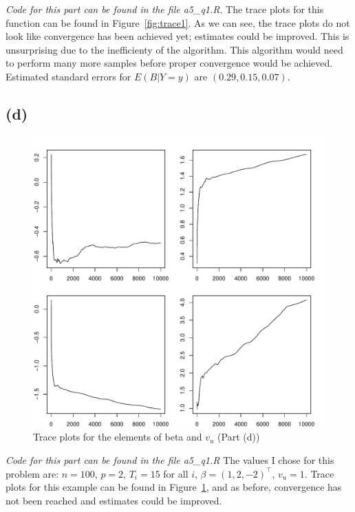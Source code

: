 \documentclass{article}\usepackage[]{graphicx}\usepackage[]{color}
\makeatletter
\def\maxwidth{ %
  \ifdim\Gin@nat@width>\linewidth
    \linewidth
  \else
    \Gin@nat@width
  \fi
}
\newenvironment{knitrout}{}{} %
\makeatother
\begin{document}
\emph{Code for this part can be found in the file a5\_q1.R}. The trace plots for this function can be found in Figure~\ref{fig:trace1}.  As we can see, the trace plots do not look like convergence has been achieved yet; estimates could be improved.  This is unsurprising due to the inefficienty of the algorithm.  This algorithm would need to perform many more samples before proper convergence would be achieved.  Estimated standard errors for $E(B|Y=y)$ are $(0.29, 0.15, 0.07)$.

\subsection*{(d)}
\begin{knitrout}
\color{fgcolor}\begin{figure}
\includegraphics[width=\maxwidth]{figure/trace2-1} \caption[Trace plots for the elements of beta and ]{Trace plots for the elements of beta and $v_u$ (Part (d))}\label{fig:trace2}
\end{figure}


\end{knitrout}

\emph{Code for this part can be found in the file a5\_q1.R} The values I chose for this problem are: $n=100$, $p=2$, $T_i=15$ for all $i$, $\beta=(1,2,-2)^\top$, $v_u=1$.  Trace plots for this example can be found in Figure~\ref{fig:trace2}, and as before, convergence has not been reached and estimates could be improved.
\end{document}
